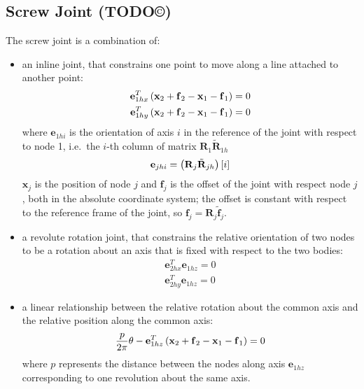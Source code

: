 \documentclass[10pt,dvips,fleqn,subeqn]{report}
\newcommand{\T}[1]{\bm{\mathbf{#1}}}
\begin{document}
\subsection{Screw Joint (TODO\copyright)}
The screw joint is a combination of:
\begin{itemize}
\item an inline joint, that constrains one point to move along 
a line attached to another point:
\begin{align*}
	\T{e}_{1hx}^T\plbr{\T{x}_2 + \T{f}_2 - \T{x}_1 - \T{f}_1} &= 0 \\
	\T{e}_{1hy}^T\plbr{\T{x}_2 + \T{f}_2 - \T{x}_1 - \T{f}_1} &= 0
\end{align*}
where $\T{e}_{1hi}$ is the orientation of axis $i$ in the reference
of the joint with respect to node 1, i.e.\ the $i$-th column of matrix
$\T{R}_1 \tilde{\T{R}}_{1h}$
\begin{equation}
	\T{e}_{jhi} = \plbr{\T{R}_j \tilde{\T{R}}_{jh}}\sqbr{i}
\end{equation}
$\T{x}_j$ is the position of node $j$
and $\T{f}_j$ is the offset of the joint with respect node $j$,
both in the absolute coordinate system; the offset is constant
with respect to the reference frame of the joint,
so $\T{f}_j=\T{R}_j\tilde{\T{f}}_j$.

\item a revolute rotation joint, that constrains the relative
orientation of two nodes to be a rotation about an axis that
is fixed with respect to the two bodies:
\begin{align*}
	\T{e}_{2hx}^T \T{e}_{1hz} = 0 \\
	\T{e}_{2hy}^T \T{e}_{1hz} = 0
\end{align*}

\item a linear relationship between the relative rotation
about the common axis and the relative position along the common axis:
\begin{equation}
	\label{eq:SCREW-constraint}
	\frac{p}{2 \pi} \theta - \T{e}_{1hz}^T\plbr{\T{x}_2 + \T{f}_2 - \T{x}_1 - \T{f}_1} = 0
\end{equation}
where $p$ represents the distance between the nodes 
along axis $\T{e}_{1hz}$ corresponding to one revolution 
about the same axis.
\end{itemize}
\end{document}
